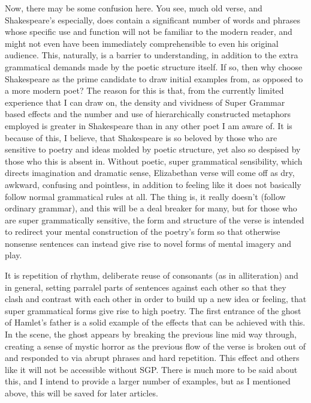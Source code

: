 \documentclass[]{article}
\begin{document}
Now, there may be some confusion here. You see, much old verse, and Shakespeare's especially, does contain a significant number of words and phrases whose specific use and function will not be familiar to the modern reader, and might not even have been immediately comprehensible to even his original audience. This, naturally, is a barrier to understanding, in addition to the extra grammatical demands made by the poetic structure itself. If so, then why choose Shakespeare as the prime candidate to draw initial examples from, as opposed to a more modern poet? The reason for this is that, from the currently limited experience that I can draw on, the density and vividness of Super Grammar based effects and the number and use of hierarchically constructed metaphors employed is greater in Shakespeare than in any other poet I am aware of. It is because of this, I believe, that Shakespeare is so beloved by those who are sensitive to poetry and ideas molded by poetic structure, yet also so despised by those who this is absent in. Without poetic, super grammatical sensibility, which directs imagination and dramatic sense, Elizabethan verse will come off as dry, awkward, confusing and pointless, in addition to feeling like it does not basically follow normal grammatical rules at all. The thing is, it really doesn't (follow ordinary grammar), and this will be a deal breaker for many, but for those who are super grammatically sensitive, the form and structure of the verse is intended to redirect your mental construction of the poetry's form so that otherwise nonsense sentences can instead give rise to novel forms of mental imagery and play.

It is repetition of rhythm, deliberate reuse of consonants (as in alliteration) and in general, setting parralel parts of sentences against each other so that they clash and contrast with each other in order to build up a new idea or feeling, that super grammatical forms give rise to high poetry. The first entrance of the ghost of Hamlet's father is a solid example of the effects that can be achieved with this. In the scene, the ghost appears by breaking the previous line mid way through, creating a sense of mystic horror as the previous flow of the verse is broken out of and responded to via abrupt phrases and hard repetition. This effect and others like it will not be accessible without SGP. There is much more to be said about this, and I intend to provide a larger number of examples, but as I mentioned above, this will be saved for later articles.
\end{document}
